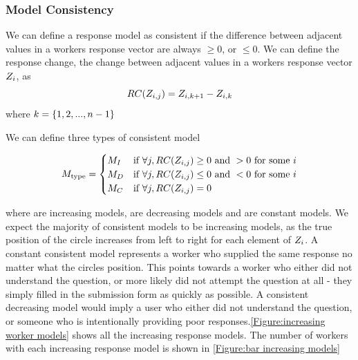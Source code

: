 

\subsubsection{Model Consistency}
We can define a response model as consistent if the difference between adjacent values in a workers response vector are always $\geqslant 0$, or $\leqslant 0$. We can define the response change, the change between adjacent values in a workers response vector $Z_i$, as
\[RC(Z_{i,j})=Z_{i,k+1}-Z_{i,k}\]
where $k=\lbrace 1,2,...,n -1 \rbrace $

We can define three types of consistent model 

\[
M_\text{type}=
\begin{cases}
M_I & \text{if } \forall j, RC(Z_{i,j}) \geq 0 \text{ and } >0 \text{ for some \ensuremath{i}} \\
M_D      & \text{if } \forall j, RC(Z_{i,j}) \leq 0 \text{ and } < 0 \text{ for some \ensuremath{i}}\\
M_C    & \text{if } \forall j, RC(Z_{i,j}) = 0 
 \end{cases}
\]

where \consInc are increasing models, \consDec are decreasing models and \consCon are constant models. We expect the majority of consistent models to be increasing models, as the true position of the circle increases from left to right for each element of $Z_i$. A constant consistent model represents a worker who supplied the same response no matter what the circles position. This points towards a worker who either did not understand the question, or more likely did not attempt the question at all - they simply filled in the submission form as quickly as possible. A consistent decreasing model would imply a user who either did not understand the question, or someone who is intentionally providing poor responses.\ref{Figure:increasing worker models} shows all the increasing response models. The number of workers with each increasing response model is shown in \ref{Figure:bar increasing models}

